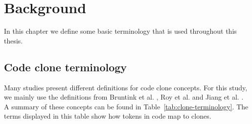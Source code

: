 \chapter{Background}
\label{ch:background}
In this chapter we define some basic terminology that is used throughout this thesis.

\section{Code clone terminology}\label{sec:terminology}
Many studies present different definitions for code clone concepts. For this study, we mainly use the definitions from Bruntink et al. \cite{bruntink2005use}, Roy et al. \cite{roy2007survey} and Jiang et al. \cite{jiang2007deckard}. A summary of these concepts can be found in Table~\ref{tab:clone-terminology}. The terms displayed in this table show how tokens in code map to clones.

